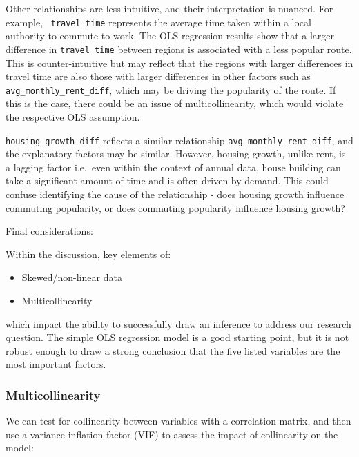 \documentclass[
  number]{elsarticle}
\providecommand{\tightlist}{%
  \setlength{\itemsep}{0pt}\setlength{\parskip}{0pt}}
\begin{document}
Other relationships are less intuitive, and their interpretation is
nuanced. For example,
~\texttt{\textquotesingle{}travel\_time\textquotesingle{}} represents
the average time taken within a local authority to commute to work. The
OLS regression results show that a larger difference in
\texttt{\textquotesingle{}travel\_time\textquotesingle{}} between
regions is associated with a less popular route. This is
counter-intuitive but may reflect that the regions with larger
differences in travel time are also those with larger differences in
other factors such as
\texttt{\textquotesingle{}avg\_monthly\_rent\_diff\textquotesingle{}},
which may be driving the popularity of the route. If this is the case,
there could be an issue of multicollinearity, which would violate the
respective OLS assumption.

\texttt{\textquotesingle{}housing\_growth\_diff\textquotesingle{}}
reflects a similar relationship
\texttt{\textquotesingle{}avg\_monthly\_rent\_diff\textquotesingle{}},
and the explanatory factors may be similar. However, housing growth,
unlike rent, is a lagging factor i.e.~even within the context of annual
data, house building can take a significant amount of time and is often
driven by demand. This could confuse identifying the cause of the
relationship - does housing growth influence commuting popularity, or
does commuting popularity influence housing growth?

Final considerations:

Within the discussion, key elements of:

\begin{itemize}
\tightlist
\item
  Skewed/non-linear data
\item
  Multicollinearity
\end{itemize}

which impact the ability to successfully draw an inference to address
our research question. The simple OLS regression model is a good
starting point, but it is not robust enough to draw a strong conclusion
that the five listed variables are the most important factors.

\subsubsection{Multicollinearity}\label{sec-multicollinearity-ols-1}

We can test for collinearity between variables with a correlation
matrix, and then use a variance inflation factor (VIF) to assess the
impact of collinearity on the model:
\end{document}
